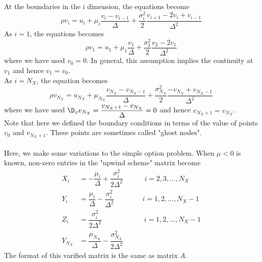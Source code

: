 \documentclass[11pt]{etk-article}
\begin{document}
At the boundaries in the i dimension, the equations become 
\begin{equation}
\rho v_i = u_i + \mu_i \dfrac{v_i-v_{i-1}}{\Delta} + \dfrac{\sigma_i^2}{2} \dfrac{v_{i+1} - 2v_i + v_{i-1}}{\Delta^2}
\end{equation}
As $i =1$, the equations becomes
\begin{equation}
\rho v_1 = u_1 + \mu_1 \dfrac{v_1}{\Delta} + \dfrac{\sigma_1^2}{2} \dfrac{v_{2} - 2v_1}{\Delta^2}
\end{equation}
where we have used $v_0 = 0$. In general, this assumption implies the continuity at $v_1$ and hence $v_1 = v_0$.\\
As $i=N_X$, the equation becomes
\begin{equation}
\rho v_{N_X} = u_{N_X} + \mu_{N_X} \dfrac{v_{N_X}-v_{{N_X}-1}}{\Delta} + \dfrac{\sigma_{N_X}^2}{2} \dfrac{-v_{N_X} + v_{{N_X}-1}}{\Delta^2}
\end{equation}
where we have used $\D_{x} v_{N_X} = \dfrac{v_{N_X+1}-v_{N_X}}{\Delta} = 0$ and hence $v_{N_X+1} = v_{N_X}$. \\
Note that here we defined the boundary conditions in terms of the value of points $v_0$ and $v_{N_X+1}$. These points are sometimes called "ghost nodes". \\
\\
Here, we make some variations to the simple option problem. When $\mu < 0$ is known, non-zero entries in the "upwind scheme" matrix become
\begin{align}
X_i &= -\dfrac{\mu_i}{\Delta} + \dfrac{\sigma_i^2}{2\Delta^2} \qquad \quad  i = 2, 3, ..., N_X \\
Y_i &= \dfrac{\mu_i}{\Delta} - \dfrac{\sigma_i^2}{\Delta^2} \qquad \qquad   i = 1, 2, ..., N_X-1 \\
Z_i &= \dfrac{\sigma_i^2}{2\Delta^2} \qquad  \qquad \qquad i = 1, 2, ..., N_X-1\\
Y_{N_X} & = \dfrac{\mu_{N_X}}{\Delta} - \dfrac{\sigma_{N_X}^2}{2\Delta^2}
\end{align}
The format of this varified matrix is the same as matrix $A$.





\end{document}
